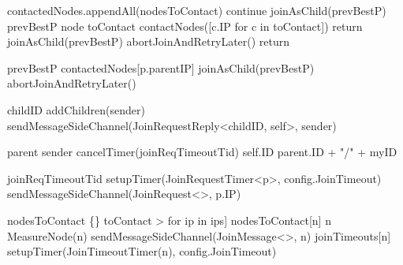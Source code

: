 \begin{algorithm}{}
\begin{algorithmic}[1]
 \label{alg:memb:join:cond_go}
    \State contactedNodes.appendAll(nodesToContact)
         \label{alg:memb:join:verif_children}
            \State continue 
        \EndIf
         \label{alg:memb:join:verif_vs_prev}
            \State joinAsChild(prevBestP)
        \Else
            \State prevBestP \asdassign node \label{alg:memb:join:advance}
            \State toContact 
            \State contactNodes([c.IP for c in toContact])
        \EndIf
        \State return
    \EndFor
    {joinAsChild(prevBestP)}  \label{alg:memb:join:join_base_case}
    {abortJoinAndRetryLater()} 
    \State return
\asdend

 \label{alg:memb:join:exclusions}
\asdend

            \State prevBestP \asdassign contactedNodes[p.parentIP]
            \State joinAsChild(prevBestP)
        \Else
            \State abortJoinAndRetryLater()
        \EndIf
    \EndIf
\asdend

    \State childID \asdassign addChildren(sender) 
    \State sendMessageSideChannel(JoinRequestReply<childID, self>, sender)
\asdend
    
        \State parent \asdassign sender 
        \State cancelTimer(joinReqTimeoutTid)
        \State self.ID \asdassign parent.ID + "/" + myID 
    \EndIf
\asdend

    \State joinReqTimeoutTid \asdassign setupTimer(JoinRequestTimer<p>, config.JoinTimeout)
    \State sendMessageSideChannel(JoinRequest<>, p.IP)
\asdend

    \State nodesToContact \asdassign \{\}
    \State toContact \asdassign [Node<0,nil,0,false,ip,false,[]> for ip in ips]
        \State nodesToContact[n] \asdassign n
        \State MeasureNode(n) 
        \State sendMessageSideChannel(JoinMessage<>, n)
        \State joinTimeouts[n] \asdassign \asdassign setupTimer(JoinTimeoutTimer(n), config.JoinTimeout)
    \EndFor
\asdend

\end{algorithmic}
\end{algorithm}
